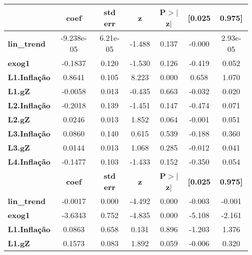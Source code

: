 \begin{center}
\begin{tabular}{lcccccc}
\toprule
                     & \textbf{coef} & \textbf{std err} & \textbf{z} & \textbf{P$> |$z$|$} & \textbf{[0.025} & \textbf{0.975]}  \\
\midrule
\textbf{lin\_trend}  &   -9.238e-05  &     6.21e-05     &    -1.488  &         0.137        &       -0.000    &     2.93e-05     \\
\textbf{exog1}       &      -0.1837  &        0.120     &    -1.530  &         0.126        &       -0.419    &        0.052     \\
\textbf{L1.Inflação} &       0.8641  &        0.105     &     8.223  &         0.000        &        0.658    &        1.070     \\
\textbf{L1.gZ}       &      -0.0058  &        0.013     &    -0.435  &         0.663        &       -0.032    &        0.020     \\
\textbf{L2.Inflação} &      -0.2018  &        0.139     &    -1.451  &         0.147        &       -0.474    &        0.071     \\
\textbf{L2.gZ}       &       0.0246  &        0.013     &     1.852  &         0.064        &       -0.001    &        0.051     \\
\textbf{L3.Inflação} &       0.0860  &        0.140     &     0.615  &         0.539        &       -0.188    &        0.360     \\
\textbf{L3.gZ}       &       0.0144  &        0.013     &     1.068  &         0.285        &       -0.012    &        0.041     \\
\textbf{L4.Inflação} &      -0.1477  &        0.103     &    -1.433  &         0.152        &       -0.350    &        0.054     \\
                     & \textbf{coef} & \textbf{std err} & \textbf{z} & \textbf{P$> |$z$|$} & \textbf{[0.025} & \textbf{0.975]}  \\
\midrule
\textbf{lin\_trend}  &      -0.0017  &        0.000     &    -4.492  &         0.000        &       -0.003    &       -0.001     \\
\textbf{exog1}       &      -3.6343  &        0.752     &    -4.835  &         0.000        &       -5.108    &       -2.161     \\
\textbf{L1.Inflação} &       0.0863  &        0.658     &     0.131  &         0.896        &       -1.203    &        1.376     \\
\textbf{L1.gZ}       &       0.1573  &        0.083     &     1.892  &         0.059        &       -0.006    &        0.320     \\

\end{tabular}
\end{center}
